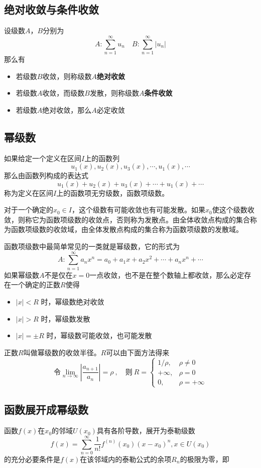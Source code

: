 \documentclass[a4paper,zihao=-4,UTF8]{ctexbook}
\begin{document}
\subsection{绝对收敛与条件收敛}
设级数$A$，$B$分别为
\[A:\sum_{n=1}^\infty u_n\quad B:\sum_{n=1}^\infty |u_n|\]
那么有
\begin{itemize}[nosep,left=2em]
    \item 若级数$B$收敛，则称级数$A${\bfseries 绝对收敛}
    \item 若级数$A$收敛，而级数$B$发散，则称级数$A${\bfseries 条件收敛}
    \item 若级数$A$绝对收敛，那么$A$必定收敛
\end{itemize}
\subsection{幂级数}
如果给定一个定义在区间$I$上的函数列
\[u_1(x),u_2(x),u_3(x),\cdots,u_1(x),\cdots\]
那么由函数列构成的表达式
\[u_1(x)+u_2(x)+u_3(x)+\cdots+u_1(x)+\cdots\]
称为定义在区间$I$上的函数项无穷级数，函数项级数。

对于一个确定的$x_0\in I$，这个级数有可能收敛也有可能发散。如果$x_0$使这个级数收敛，则称它为函数项级数的收敛点，否则称为发散点。由全体收敛点构成的集合称为函数项级数的收敛域，由全体发散点构成的集合称为函数项级数的发散域。

函数项级数中最简单常见的一类就是幂级数，它的形式为
\[A:\sum_{n=1}^\infty a_n x^n=a_0+a_1x+a_2x^2+\cdots+a_nx^n+\cdots\]
如果幂级数$A$不是仅在$x=0$一点收敛，也不是在整个数轴上都收敛，那么必定存在一个确定的正数$R$使得
\begin{itemize}[nosep,left=2em]
    \item $|x|<R$ 时，幂级数绝对收敛
    \item $|x|>R$ 时，幂级数发散
    \item $|x|=\pm R$ 时，幂级数可能收敛，也可能发散
\end{itemize}
正数$R$叫做幂级数的收敛半径。$R$可以由下面方法得来
\[\text{令}\lim_{n\to\infty}\left| \frac{a_{n+1}}{a_n}\right|=\rho\ ,\quad\text{则}\ %
R=\begin{cases}
  1/\rho,&\rho\ne0\\
  +\infty,&\rho=0\\
  0,&\rho=+\infty  
\end{cases}\]
\subsection{函数展开成幂级数}
函数$f(x)$在$x_0$的邻域$U(x_0)$具有各阶导数，展开为泰勒级数
\[f(x)=\sum_{n=0}^\infty \frac{1}{n!}f^{(n)}(x_0)(x-x_0)^n,x\in U(x_0)\]
的充分必要条件是$f(x)$在该邻域内的泰勒公式的余项$R_n$的极限为零，即
\end{document}
